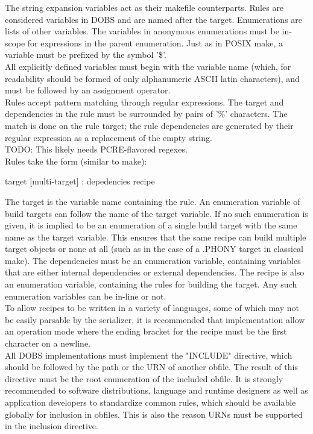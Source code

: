 The string expansion variables act as their makefile counterparts. Rules are considered variables in DOBS and are named after the target. Enumerations are lists of other variables. The variables in anonymous enumerations must be in-scope for expressions in the parent enumeration. Just as in POSIX make, a variable must be prefixed by the symbol '\$'.\\
All explicitly defined variables must begin with the variable name (which, for readability should be formed of only alphanumeric ASCII latin characters), and must be followed by an assignment operator.\\
Rules accept pattern matching through regular expressions. The target and dependencies in the rule must be surrounded by pairs of '\%' characters. The match is done on the rule target; the rule dependencies are generated by their regular expression as a replacement of the empty string.\\
TODO: This likely needs PCRE-flavored regexes.\\
Rules take the form (similar to make):
\begin{center}
	target [multi-target] : depedencies recipe
\end{center}
The target is the variable name containing the rule. An enumeration variable of build targets can follow the name of the target variable. If no such enumeration is given, it is implied to be an enumeration of a single build target with the same name as the target variable. This ensures that the same recipe can build multiple target objects or none at all (such as in the case of a .PHONY target in classical make). The dependencies must be an enumeration variable, containing variables that are either internal dependencies or external dependencies. The recipe is also an enumeration variable, containing the rules for building the target. Any such enumeration variables can be in-line or not.\\
To allow recipes to be written in a variety of languages, some of which may not be easily parsable by the serializer, it is recommended that implementation allow an operation mode where the ending bracket for the recipe must be the first character on a newline.\\
All DOBS implementations must implement the "INCLUDE" directive, which should be followed by the path or the URN of another obfile. The result of this directive must be the root enumeration of the included obfile. It is strongly recommended to software distributions, language and runtime designers as well as application developers to standardize common rules, which should be available globally for inclusion in obfiles. This is also the reason URNs must be supported in the inclusion directive.\\
